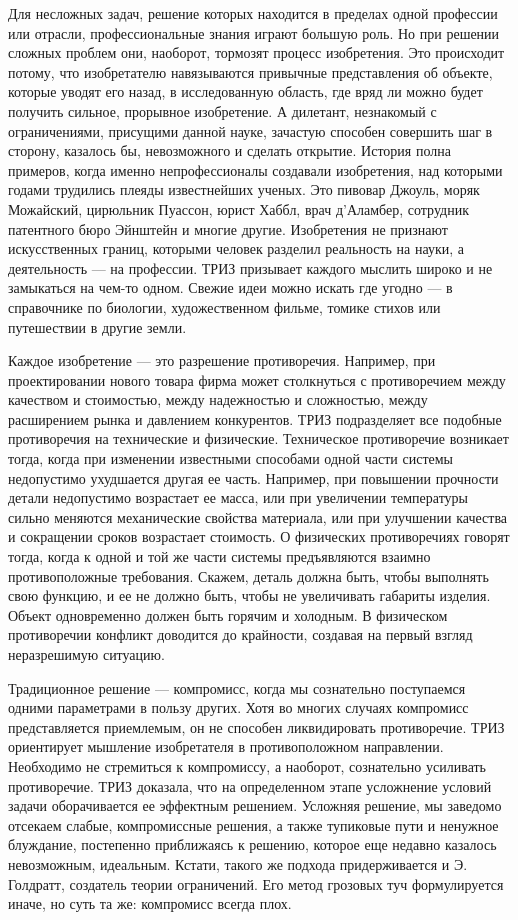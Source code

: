 Для  несложных  задач,  решение  которых находится  в  пределах  одной
профессии или  отрасли, профессиональные  знания играют  большую роль.
Но  при  решении  сложных  проблем  они,  наоборот,  тормозят  процесс
изобретения.  Это  происходит  потому, что  изобретателю  навязываются
привычные  представления  об  объекте,  которые уводят  его  назад,  в
исследованную  область,  где вряд  ли  можно  будет получить  сильное,
прорывное  изобретение.   А  дилетант,  незнакомый   с  ограничениями,
присущими  данной науке,  зачастую способен  совершить шаг  в сторону,
казалось бы, невозможного и  сделать открытие. История полна примеров,
когда  именно  непрофессионалы  создавали  изобретения,  над  которыми
годами трудились плеяды известнейших ученых. Это пивовар Джоуль, моряк
Можайский, цирюльник  Пуассон, юрист Хаббл, врач  д'Аламбер, сотрудник
патентного  бюро Эйнштейн  и  многие другие.  Изобретения не  признают
искусственных границ, которыми человек разделил реальность на науки, а
деятельность — на  профессии. ТРИЗ призывает каждого  мыслить широко и
не замыкаться на чем-то одном. Свежие идеи можно искать где угодно — в
справочнике  по биологии,  художественном  фильме,  томике стихов  или
путешествии в другие земли.

Каждое  изобретение  —  это  разрешение  противоречия.  Например,  при
проектировании нового  товара фирма может столкнуться  с противоречием
между качеством  и стоимостью,  между надежностью и  сложностью, между
расширением  рынка  и  давлением конкурентов.  ТРИЗ  подразделяет  все
подобные  противоречия   на  технические  и   физические.  Техническое
противоречие возникает тогда, когда при изменении известными способами
одной части системы недопустимо  ухудшается другая ее часть. Например,
при повышении  прочности детали  недопустимо возрастает ее  масса, или
при  увеличении  температуры  сильно  меняются  механические  свойства
материала, или  при улучшении качества и  сокращении сроков возрастает
стоимость. О физических  противоречиях говорят тогда, когда  к одной и
той же части системы предъявляются взаимно противоположные требования.
Скажем,  деталь  должна  быть,  чтобы выполнять  свою  функцию,  и  ее
не  должно  быть,  чтобы   не  увеличивать  габариты  изделия.  Объект
одновременно должен быть горячим и холодным. В физическом противоречии
конфликт   доводится  до   крайности,   создавая   на  первый   взгляд
неразрешимую ситуацию.

Традиционное решение  — компромисс,  когда мы  сознательно поступаемся
одними параметрами в пользу других.  Хотя во многих случаях компромисс
представляется приемлемым, он  не способен ликвидировать противоречие.
ТРИЗ ориентирует мышление  изобретателя в противоположном направлении.
Необходимо  не  стремиться  к  компромиссу,  а  наоборот,  сознательно
усиливать  противоречие.  ТРИЗ  доказала, что  на  определенном  этапе
усложнение  условий   задачи  оборачивается  ее   эффектным  решением.
Усложняя решение, мы заведомо  отсекаем слабые, компромиссные решения,
а также тупиковые пути и  ненужное блуждание, постепенно приближаясь к
решению, которое еще недавно  казалось невозможным, идеальным. Кстати,
такого  же  подхода придерживается  и  Э.  Голдратт, создатель  теории
ограничений. Его  метод грозовых туч  формулируется иначе, но  суть та
же: компромисс всегда плох.

